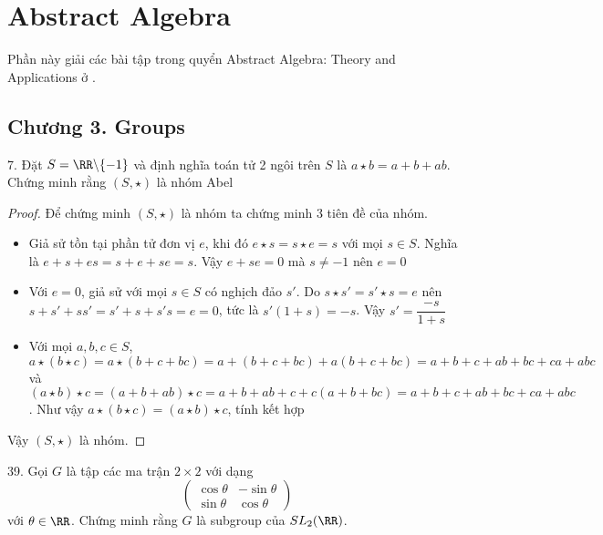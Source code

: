 \chapter{Abstract Algebra}

Phần này giải các bài tập trong quyển Abstract Algebra: Theory and Applications ở \cite{Judson2012}.

\section*{Chương 3. Groups}

7. Đặt $S = \RR \backslash \{-1\}$ và định nghĩa toán tử 2 ngôi trên $S$ là $a \star b = a + b + ab$. Chứng minh rằng $(S, \star)$ là nhóm Abel

\begin{proof}
    Để chứng minh $(S, \star)$ là nhóm ta chứng minh 3 tiên đề của nhóm.
    \begin{itemize}
        \item Giả sử tồn tại phần tử đơn vị $e$, khi đó $e \star s = s \star e = s$ với mọi $s \in S$. Nghĩa là $e + s + es = s + e + se = s$. Vậy $e + se = 0$ mà $s \neq -1$ nên $e = 0$
        \item Với $e = 0$, giả sử với mọi $s \in S$ có nghịch đảo $s'$. Do $s \star s' = s' \star s = e$ nên $s + s' + ss' = s' + s + s's = e = 0$, tức là $s'(1 + s) = -s$. Vậy $s' = \dfrac{-s}{1 + s}$
        \item Với mọi $a, b, c \in S$, $a \star (b \star c) = a \star (b + c + bc) = a + (b+c+bc) + a (b+c+bc) = a + b + c + ab + bc + ca + abc$ và $(a \star b) \star c = (a + b + ab) \star c = a + b + ab + c + c(a+b+bc) = a + b + c + ab + bc + ca + abc$. Như vậy $a \star (b \star c) = (a \star b) \star c$, tính kết hợp
    \end{itemize}
    Vậy $(S, \star)$ là nhóm.
\end{proof}

39. Gọi $G$ là tập các ma trận $2 \times 2$ với dạng
\[ \begin{pmatrix}
    \cos \theta & -\sin \theta \\ \sin \theta & \cos \theta
\end{pmatrix}\] với $\theta \in \RR$. Chứng minh rằng $G$ là subgroup của $SL_2 (\RR)$.
    
